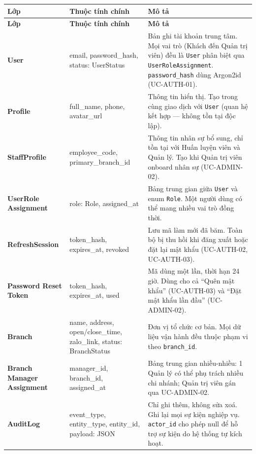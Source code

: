 \begingroup
\renewcommand{\arraystretch}{1.3}
\begin{longtable}{|>{\centering\arraybackslash}m{3.2cm}|>{\ttfamily\raggedright\arraybackslash}m{3.5cm}|>{\raggedright\arraybackslash}m{7.5cm}|}
\hline
\textbf{Lớp} & \normalfont\textbf{Thuộc tính chính} & \textbf{Mô tả} \\ \hline
\endfirsthead
\hline
\textbf{Lớp} & \normalfont\textbf{Thuộc tính chính} & \textbf{Mô tả} \\ \hline
\endhead
\hline
\endfoot

\textbf{User} &
  email, password\_hash, status: UserStatus &
  Bản ghi tài khoản trung tâm. Mọi vai trò (Khách đến Quản trị viên) đều
  là \texttt{User} phân biệt qua \texttt{UserRoleAssignment}.
  \texttt{password\_hash} dùng Argon2id (UC-AUTH-01). \\ \hline

\textbf{Profile} &
  full\_name, phone, avatar\_url &
  Thông tin hiển thị. Tạo trong cùng giao dịch với \texttt{User}
  (quan hệ kết hợp — không tồn tại độc lập). \\ \hline

\textbf{StaffProfile} &
  employee\_code, primary\_branch\_id &
  Thông tin nhân sự bổ sung, chỉ tồn tại với Huấn luyện viên và Quản lý.
  Tạo khi Quản trị viên onboard nhân sự (UC-ADMIN-02). \\ \hline

\textbf{UserRole Assignment} &
  role: Role, assigned\_at &
  Bảng trung gian giữa \texttt{User} và enum \texttt{Role}.
  Một người dùng có thể mang nhiều vai trò đồng thời. \\ \hline

\textbf{RefreshSession} &
  token\_hash, expires\_at, revoked &
  Lưu mã làm mới đã băm. Toàn bộ bị thu hồi khi đăng xuất
  hoặc đặt lại mật khẩu (UC-AUTH-02, UC-AUTH-03). \\ \hline

\textbf{Password Reset Token} &
  token\_hash, expires\_at, used &
  Mã dùng một lần, thời hạn 24 giờ. Dùng cho cả ``Quên mật khẩu''
  (UC-AUTH-03) và ``Đặt mật khẩu lần đầu'' (UC-ADMIN-02). \\ \hline

\textbf{Branch} &
  name, address, open/close\_time, zalo\_link, status: BranchStatus &
  Đơn vị tổ chức cơ bản. Mọi dữ liệu vận hành đều thuộc phạm vi
  theo \texttt{branch\_id}. \\ \hline

\textbf{Branch Manager Assignment} &
  manager\_id, branch\_id, assigned\_at &
  Bảng trung gian nhiều-nhiều: 1 Quản lý có thể phụ trách nhiều chi
  nhánh; Quản trị viên gán qua UC-ADMIN-02. \\ \hline

\textbf{AuditLog} &
  event\_type, entity\_type, entity\_id, payload: JSON &
  Chỉ ghi thêm, không sửa xoá. Ghi lại mọi sự kiện nghiệp vụ.
  \texttt{actor\_id} cho phép null để hỗ trợ sự kiện do hệ thống tự kích hoạt. \\ \hline

\end{longtable}
\endgroup

